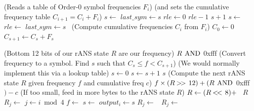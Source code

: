 \documentclass[a4paper]{article}
\begin{document}
\begin{algorithmic}[1]
\Statex (Reads a table of Order-0 symbol frequencies $F_i$)
\Statex (and sets the cumulative frequency table $C_{i+1} = C_i+F_i$)
\State $s \gets$ 
\State $last\_sym \gets s$
\State $rle \gets 0$
\Repeat
  \settowidth{\maxwidth}{$C_s$}
  \State {} 
    \settowidth{\maxwidth}{rle\ }
    \State {} $rle-1$
    \State {} $s+1$
  \Else
    \State $s \gets$ 
      \State $rle \gets$ 
    \EndIf
  \EndIf
  \State $last\_sym \gets s$
\Statex \quad\ (Compute cumulative frequencies $C_i$ from $F_i$)
\State $C_0 \gets 0$
  \State $C_{s+1} \gets C_s + F_s$
\EndFor
\EndProcedure

\Statex
\Statex (Bottom 12 bits of our rANS state $R$ are our frequency)
  \State \Return $R\ \bitand$ 0xfff
\EndFunction
\Statex
\Statex (Convert frequency to a symbol. Find $s$ such that $C_s \le f < C_{s+1}$)
\Statex (We would normally implement this via a lookup table)
  \State $s \gets 0$
    \State $s \gets s+1$
  \EndWhile
  \State \Return $s$
\EndFunction
\Statex
\Statex (Compute the next rANS state $R$ given frequency $f$ and cumulative freq $c$)
  \State \Return $f \times (R \shiftr 12) + (R\ \bitand$ 0xfff$) - c$
\EndFunction
\Statex
\Statex (If too small, feed in more bytes to the rANS state $R$)
    \State $R \gets (R \mathbin{<\mkern-3mu<\,} 8) +$\ 
  \EndWhile
  \State \Return $R$
\EndFunction
\Statex
{}
  \State {}
    \State $R_j \gets$ 
  \EndFor
    \State $j \gets i \bmod 4$
    \State $f \gets$ 
    \State $s \gets$ 
    \State $output_i \gets s$
    \State $R_j \gets$\ 
    \State $R_j \gets$\ 
  \EndFor
\EndProcedure
\end{algorithmic}
\end{document}
